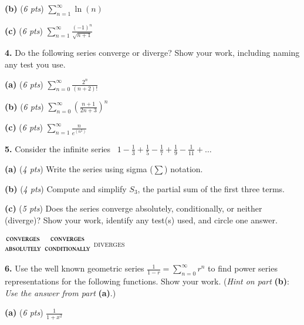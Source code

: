 \documentclass[12pt]{article}
\renewcommand{\emph}[1]{\textsf{\textbf{#1}}}
\let\ds\displaystyle
\newcommand{\prob}[1]{\bigskip\noindent\textbf{#1.} }
\newcommand{\pts}[1]{{\small (\textsl{#1 pts})}}
\newcommand{\epartpts}[2]{\medskip\noindent \textbf{(#1)} \pts{#2} \quad}
\begin{document}
\epartpts{b}{6} $\ds \sum_{n=1}^\infty \ln(n)$
\vspace{1.8in}

\epartpts{c}{6} $\ds \sum_{n=1}^\infty \frac{(-1)^n}{\sqrt{n+1}}$
\vfill


\newpage\clearpage
\prob{4} Do the following series converge or diverge?  Show your work, including naming any test you use.

\epartpts{a}{6}  $\ds \sum_{n=0}^\infty \frac{2^n}{(n+2)!}$
\vfill

\epartpts{b}{6}  $\ds \sum_{n=0}^\infty \left(\frac{n+1}{2n+3}\right)^n$
\vfill

\epartpts{c}{6}  $\ds \sum_{n=1}^\infty \frac{n}{e^{(n^2)}}$
\vfill


\newpage\clearpage
\newcommand{\threeopts}{{\small $\begin{matrix} \text{\textsc{converges}} \\ \text{\textsc{absolutely}} \end{matrix}$ \qquad\qquad $\begin{matrix} \text{\textsc{converges}} \\ \text{\textsc{conditionally}} \end{matrix}$ \qquad\qquad \textsc{diverges}} \bigskip}

\prob{5} Consider the infinite series \, $\ds 1 - \frac{1}{3} + \frac{1}{5} - \frac{1}{7} + \frac{1}{9} - \frac{1}{11} +\dots$

\epartpts{a}{4}  Write the series using sigma ($\sum$) notation.
\vfill

\epartpts{b}{4}  Compute and simplify $S_3$, the partial sum of the first three terms.
\vfill

\epartpts{c}{5}  Does the series converge absolutely, conditionally, or neither (diverge)?  Show your work, identify any test(s) used, and circle one answer. 
\vspace{3.0in}

\threeopts


\newpage\clearpage
\prob{6} Use the well known geometric series $\ds \frac{1}{1-r}=\sum_{n=0}^\infty r^n$ to find power series representations for the following functions.  Show your work.  (\textsl{Hint on part} \emph{(b)}: \textsl{Use the answer from part} \emph{(a)}.)

\epartpts{a}{6}  $\ds \frac{1}{1+x^2}$
\vfill

\newcommand{\spread}{$\ds\frac{{\large\strut}}{{\large\strut}}$}
\newcommand{\bspread}{$\ds\frac{{\Large\strut}}{{\Large\strut}}$}
\end{document}

